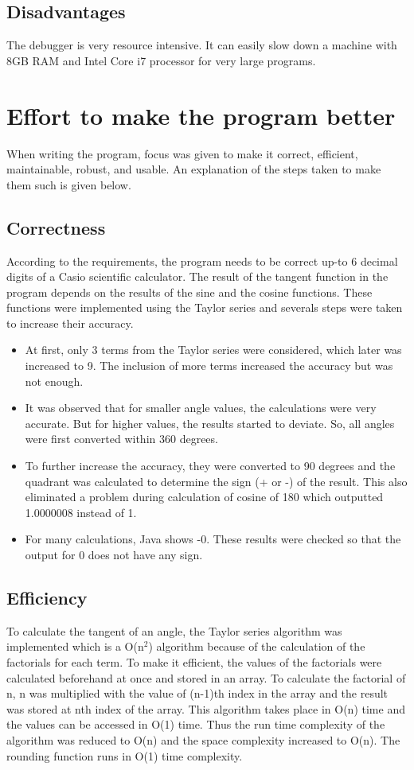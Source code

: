 \documentclass[12pt]{article}
\begin{document}
\subsection{Disadvantages}
The debugger is very resource intensive. It can easily slow down a machine with 8GB RAM and Intel Core i7 processor for very large programs.
\section{Effort to make the program better}
When writing the program, focus was given to make it correct, efficient, maintainable, robust, and usable. An explanation of the steps taken to make them such is given below.
\subsection{Correctness}
According to the requirements, the program needs to be correct up-to 6 decimal digits of a Casio scientific calculator. The result of the tangent function in the program depends on the results of the sine and the cosine functions. These functions were implemented using the Taylor series and severals steps were taken to increase their accuracy. 
\begin{itemize}
    \item At first, only 3 terms from the Taylor series were considered, which later was increased to 9. The inclusion of more terms  increased the accuracy but was not enough.
    \item It was observed that for smaller angle values, the calculations were very accurate. But for higher values, the results started to deviate. So, all angles were first converted within 360 degrees. 
    \item To further increase the accuracy, they were converted to 90 degrees and the quadrant was calculated to determine the sign (+ or -) of the result. This also eliminated a problem during calculation of cosine of 180 which outputted 1.0000008 instead of 1.
    \item For many calculations, Java shows -0. These results were checked so that the output for 0 does not have any sign.
\end{itemize}
\subsection{Efficiency}
To calculate the tangent of an angle, the Taylor series algorithm was implemented which is a O(n$^2$) algorithm because of the calculation of the factorials for each term. To make it efficient, the values of the factorials were calculated beforehand at once and stored in an array. To calculate the factorial of n, n was multiplied with the value of (n-1)th index in the array and the result was stored at nth index of the array. This algorithm takes place in O(n) time and the values can be accessed in O(1) time. Thus the run time complexity of the algorithm was reduced to O(n) and the space complexity increased to O(n). The rounding function runs in O(1) time complexity.
\end{document}
